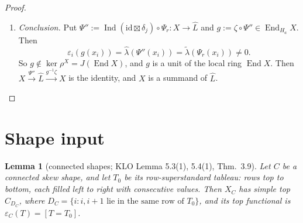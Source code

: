 \documentclass[11pt]{amsart}
\newcommand{\End}{\operatorname{End}}
\newcommand{\Ind}{\operatorname{Ind}}
\newcommand{\sq}{\boxtimes}
\theoremstyle{plain}
\newtheorem{lemmaII}{Lemma}
\theoremstyle{definition}
\begin{document}
\begin{proof}
\begin{enumerate}[label=\textup{Step \arabic*.},leftmargin=3.6em,itemsep=3pt]
\[
\ell\in W_{D_i}\iff\ell\in W_{[\alpha,a-1]}\qquad(\text{generator interval } \{s_\alpha,\dots,s_{a-1}\}).
\]
In the edge case $k=r'+1$ we have $a-k=\alpha-1\notin D_i$, both sides force $\ell=\mathrm{id}$, and $\ell=A^{a-k}B^k$ is exactly the unique ok word, so the equivalence still holds. $W_{[\alpha,a-1]}$ is the symmetric group on the values $\{\alpha,\dots,a\}$. So, as in the proof of Lemma~\ref{lem:f1f2}(b), $\ell\in W_{[\alpha,a-1]}$ iff $\ell$ fixes the values $1,\dots,\alpha-1$, iff $\ell_1=\dots=\ell_{\alpha-1}=A$, iff ``$\ell$ ok''. Hence $\varepsilon_i\circ\zeta=\widehat\lambda$.
\item \emph{Conclusion.} Put $\Psi'':=\Ind(\mathrm{id}\sq\delta_j)\circ\Psi_r:X\to\widehat L$ and $g:=\zeta\circ\Psi''\in\End_{H_a}X$. Then
\[
\varepsilon_i(g(x_i))=\widehat\lambda(\Psi''(x_i))=\widetilde\lambda(\Psi_r(x_i))\ne0.
\]
So $g\notin\ker\rho^X=J(\End X)$, and $g$ is a unit of the local ring $\End X$. Then $X\xrightarrow{\Psi''}\widehat L\xrightarrow{g^{-1}\zeta}X$ is the identity, and $X$ is a summand of $\widehat L$.\qedhere
\end{enumerate}
\end{proof}

\section{Shape input}

\begin{lemmaII}[connected shapes; KLO Lemma 5.3(1), 5.4(1), Thm.~3.9]\label{II:conn}
Let $C$ be a connected skew shape, and let $T_0$ be its row-superstandard tableau: rows top to bottom, each filled left to right with consecutive values. Then $X_C$ has simple top $C_{D_C}$, where $D_C=\{i: i,i+1\text{ lie in the same row of }T_0\}$, and its top functional is $\varepsilon_C(T)=[T=T_0]$.
\end{lemmaII}
\end{document}
